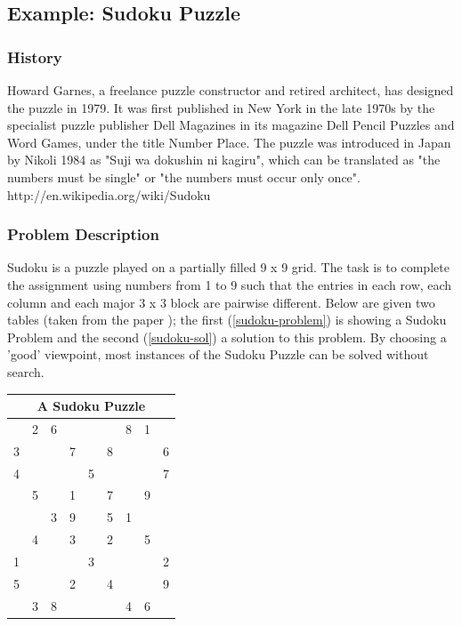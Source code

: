 \documentclass[a4paper,halfparskip]{scrartcl}
\begin{document}
\subsection{Example: Sudoku Puzzle}
\label{sudoku-puzzle}
\subsubsection{History}
Howard Garnes, a freelance puzzle constructor and retired architect, has
designed the puzzle in 1979. It was first published in New York in the late 1970s by the specialist puzzle publisher Dell Magazines in its magazine Dell Pencil Puzzles and Word Games, under the title Number Place. 
The puzzle was introduced in Japan by Nikoli 1984 as "Suji wa dokushin ni kagiru", which can be translated as "the numbers must be single" or "the numbers must occur only once".
{http://en.wikipedia.org/wiki/Sudoku}
\subsubsection{Problem Description}
Sudoku is a puzzle played on a partially filled 9 x 9 grid. The task 
is to complete the assignment using numbers from 1 to 9 such that the 
entries in each row, each column and each major 3 x 3 block are pairwise 
different. Below are given two tables (taken from the paper
\cite{8}); the first (\ref{sudoku-problem}) 
is showing a Sudoku Problem
and the second (\ref{sudoku-sol}) a solution to this problem.
By choosing  a 'good' viewpoint, most instances of the Sudoku Puzzle can be
solved without search.

\begin{tabular}{||c|c|c||c|c|c||c|c|c||}
\hline
\multicolumn{9}{||c||}{A Sudoku Puzzle \label{sudoku-problem}}\\
\hline
\hline
  & 2 & 6 &   &   &   & 8 & 1 &  \\
\hline
3 &   &   & 7 &   & 8 &   &   & 6\\
\hline
4 &   &   &   & 5 &   &   &   & 7\\
\hline
\hline
  & 5 &   & 1 &   & 7 &   & 9 &  \\
\hline
  &   & 3 & 9 &   & 5 & 1 &   &  \\
\hline
  & 4 &   & 3 &   & 2 &   & 5 &  \\
\hline
\hline
1 &   &   &   & 3 &   &   &   & 2\\
\hline
5 &   &   & 2 &   & 4 &   &   & 9\\
\hline
  & 3 & 8 &   &   &   & 4 & 6 &  \\
\hline   
\end{tabular}
\end{document}
